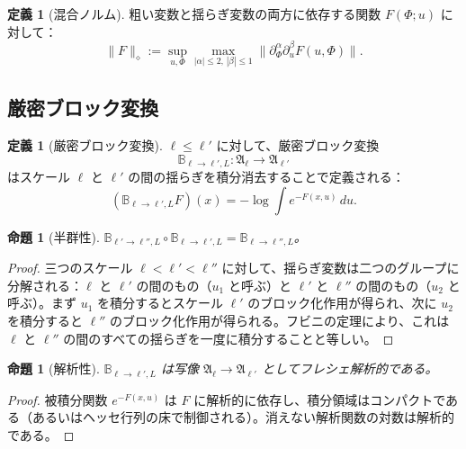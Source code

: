 \documentclass[12pt]{article}
\theoremstyle{plain}
\newtheorem{proposition}[theorem]{命題}
\theoremstyle{definition}
\newtheorem{definition}[theorem]{定義}
\numberwithin{equation}{section}
\newcommand{\fA}{\mathfrak{A}}
\begin{document}
\begin{definition}[混合ノルム]
粗い変数と揺らぎ変数の両方に依存する関数 $F(\Phi;u)$ に対して：
\begin{equation}
\|F\|_\diamond := \sup_{u,\Phi}\max_{|\alpha|\leq 2,\,|\beta|\leq 1}\|\partial_\Phi^\alpha\partial_u^\beta F(u,\Phi)\|.
\end{equation}
\end{definition}

\subsection{厳密ブロック変換}

\begin{definition}[厳密ブロック変換]
$\ell\leq\ell'$ に対して、厳密ブロック変換
\begin{equation}
\mathbb{B}_{\ell\to\ell',L}:\fA_\ell\to\fA_{\ell'}
\end{equation}
はスケール $\ell$ と $\ell'$ の間の揺らぎを積分消去することで定義される：
\begin{equation}
(\mathbb{B}_{\ell\to\ell',L}F)(x) = -\log\int e^{-F(x,u)}\,du.
\end{equation}
\end{definition}

\begin{proposition}[半群性]
$\mathbb{B}_{\ell'\to\ell'',L}\circ\mathbb{B}_{\ell\to\ell',L}=\mathbb{B}_{\ell\to\ell'',L}$。
\end{proposition}

\begin{proof}
三つのスケール $\ell<\ell'<\ell''$ に対して、揺らぎ変数は二つのグループに分解される：$\ell$ と $\ell'$ の間のもの（$u_1$ と呼ぶ）と $\ell'$ と $\ell''$ の間のもの（$u_2$ と呼ぶ）。まず $u_1$ を積分するとスケール $\ell'$ のブロック化作用が得られ、次に $u_2$ を積分すると $\ell''$ のブロック化作用が得られる。フビニの定理により、これは $\ell$ と $\ell''$ の間のすべての揺らぎを一度に積分することと等しい。
\end{proof}

\begin{proposition}[解析性]
$\mathbb{B}_{\ell\to\ell',L}$ は写像 $\fA_\ell\to\fA_{\ell'}$ としてフレシェ解析的である。
\end{proposition}

\begin{proof}
被積分関数 $e^{-F(x,u)}$ は $F$ に解析的に依存し、積分領域はコンパクトである（あるいはヘッセ行列の床で制御される）。消えない解析関数の対数は解析的である。
\end{proof}
\end{document}
